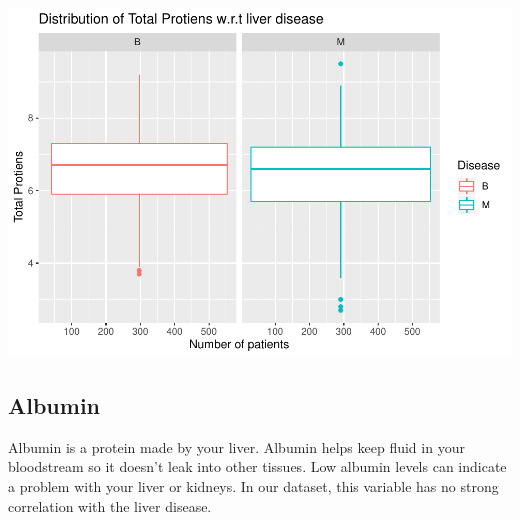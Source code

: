 \documentclass[]{article}
\newenvironment{Shaded}{\begin{snugshade}}{\end{snugshade}}
\newcommand{\CommentTok}[1]{\textcolor[rgb]{0.56,0.35,0.01}{\textit{#1}}}
\newcommand{\DataTypeTok}[1]{\textcolor[rgb]{0.13,0.29,0.53}{#1}}
\newcommand{\KeywordTok}[1]{\textcolor[rgb]{0.13,0.29,0.53}{\textbf{#1}}}
\newcommand{\NormalTok}[1]{#1}
\newcommand{\OperatorTok}[1]{\textcolor[rgb]{0.81,0.36,0.00}{\textbf{#1}}}
\newcommand{\StringTok}[1]{\textcolor[rgb]{0.31,0.60,0.02}{#1}}
\begin{document}
\begin{Shaded}
\end{Shaded}

\includegraphics{LiverDisease_files/figure-latex/unnamed-chunk-15-1.pdf}

\subsection{Albumin}

Albumin is a protein made by your liver. Albumin helps keep fluid in
your bloodstream so it doesn't leak into other tissues. Low albumin
levels can indicate a problem with your liver or kidneys. In our
dataset, this variable has no strong correlation with the liver disease.
\end{document}
